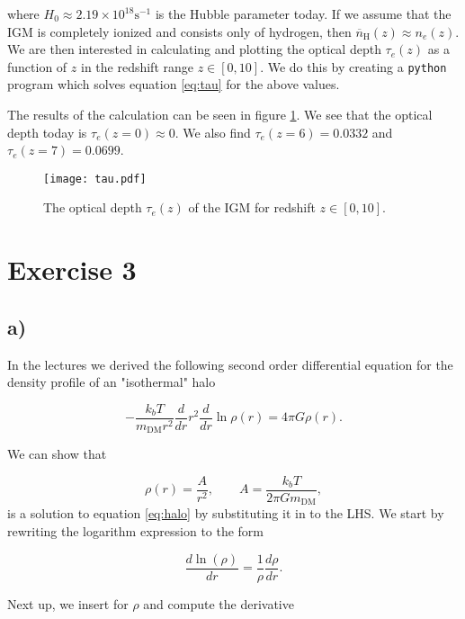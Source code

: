 \documentclass[a4paper]{article}
\begin{document}
\noindent where $H_0 \approx 2.19\times 10^{18} \mathrm{s}^{-1}$ is the Hubble parameter
today. If we assume that the IGM is completely ionized and consists only of hydrogen,
then $\overline { n } _ { \mathrm { H } } ( z ) \approx n_e(z)$. We are then interested
in calculating and plotting the optical depth $\tau_e(z)$ as a function of $z$ in the
redshift range $z\in [0,10]$. We do this by creating a \texttt{python} program which solves equation \eqref{eq:tau} for the above values.

The results of the calculation can be seen in figure \ref{fig:tau}. We see that the
optical depth today is $\tau_e(z = 0)\approx 0$. We also find $\tau_e(z = 6) = 0.0332$
and $\tau_e(z = 7) = 0.0699$.

\begin{figure}
    \centering
    \texttt{[image: tau.pdf]}
    \caption{The optical depth $\tau_e(z)$ of the IGM for redshift $z\in [0,10]$.}
    \label{fig:tau}
\end{figure}

\section*{Exercise 3}
\subsection*{a)}

In the lectures we derived the following second order differential equation for the
density profile of an "isothermal" halo

\begin{equation}\label{eq:halo}
    -\frac{k_b T}{m_{\text{DM}}r^2} \frac{d}{dr} r^2 \frac{d}{dr} \ln{\rho(r)} = 4\pi G
    \rho(r).
\end{equation}

\noindent We can show that

\begin{equation}\label{eq:halodef}
    \rho(r) = \frac{A}{r^2}, \qquad A = \frac{k_bT}{2\pi G m_{\text{DM}}},
\end{equation}
is a solution to equation \eqref{eq:halo} by substituting it in to the LHS.
We start by rewriting the logarithm expression to the form

\begin{equation*}
    \frac{d \ln(\rho)}{dr} = \frac{1}{\rho} \frac{d \rho}{dr}.
\end{equation*}

\noindent Next up, we insert for $\rho$ and compute the derivative
\end{document}
